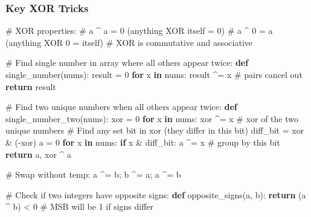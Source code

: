 \documentclass[11pt]{article}
\newenvironment{Shaded}{\begin{snugshade}}{\end{snugshade}}
\newcommand{\CommentTok}[1]{\textcolor[rgb]{0.48,0.49,0.49}{#1}}
\newcommand{\ControlFlowTok}[1]{\textcolor[rgb]{0.99,0.74,0.29}{\textbf{#1}}}
\newcommand{\DecValTok}[1]{\textcolor[rgb]{0.96,0.45,0.00}{#1}}
\newcommand{\KeywordTok}[1]{\textcolor[rgb]{0.81,0.81,0.76}{\textbf{#1}}}
\newcommand{\NormalTok}[1]{\textcolor[rgb]{0.81,0.81,0.76}{#1}}
\newcommand{\OperatorTok}[1]{\textcolor[rgb]{0.81,0.81,0.76}{#1}}
\begin{document}
\subsubsection{Key XOR Tricks}\label{key-xor-tricks}


\begin{Shaded}
\begin{Highlighting}[]
\CommentTok{\# XOR properties:}
\CommentTok{\# a \^{} a = 0 (anything XOR itself = 0)}
\CommentTok{\# a \^{} 0 = a (anything XOR 0 = itself)}
\CommentTok{\# XOR is commutative and associative}

\CommentTok{\# Find single number in array where all others appear twice:}
\KeywordTok{def}\NormalTok{ single\_number(nums):}
\NormalTok{    result }\OperatorTok{=} \DecValTok{0}
    \ControlFlowTok{for}\NormalTok{ x }\KeywordTok{in}\NormalTok{ nums:}
\NormalTok{        result }\OperatorTok{\^{}=}\NormalTok{ x   }\CommentTok{\# pairs cancel out}
    \ControlFlowTok{return}\NormalTok{ result}

\CommentTok{\# Find two unique numbers when all others appear twice:}
\KeywordTok{def}\NormalTok{ single\_number\_two(nums):}
\NormalTok{    xor }\OperatorTok{=} \DecValTok{0}
    \ControlFlowTok{for}\NormalTok{ x }\KeywordTok{in}\NormalTok{ nums: xor }\OperatorTok{\^{}=}\NormalTok{ x   }\CommentTok{\# xor of the two unique numbers}
    \CommentTok{\# Find any set bit in xor (they differ in this bit)}
\NormalTok{    diff\_bit }\OperatorTok{=}\NormalTok{ xor }\OperatorTok{\&}\NormalTok{ (}\OperatorTok{{-}}\NormalTok{xor)}
\NormalTok{    a }\OperatorTok{=} \DecValTok{0}
    \ControlFlowTok{for}\NormalTok{ x }\KeywordTok{in}\NormalTok{ nums:}
        \ControlFlowTok{if}\NormalTok{ x }\OperatorTok{\&}\NormalTok{ diff\_bit:}
\NormalTok{            a }\OperatorTok{\^{}=}\NormalTok{ x   }\CommentTok{\# group by this bit}
    \ControlFlowTok{return}\NormalTok{ a, xor }\OperatorTok{\^{}}\NormalTok{ a}

\CommentTok{\# Swap without temp:}
\NormalTok{a }\OperatorTok{\^{}=}\NormalTok{ b}\OperatorTok{;}\NormalTok{ b }\OperatorTok{\^{}=}\NormalTok{ a}\OperatorTok{;}\NormalTok{ a }\OperatorTok{\^{}=}\NormalTok{ b}

\CommentTok{\# Check if two integers have opposite signs:}
\KeywordTok{def}\NormalTok{ opposite\_signs(a, b):}
    \ControlFlowTok{return}\NormalTok{ (a }\OperatorTok{\^{}}\NormalTok{ b) }\OperatorTok{\textless{}} \DecValTok{0}   \CommentTok{\# MSB will be 1 if signs differ}
\end{Highlighting}
\end{Shaded}
\end{document}
